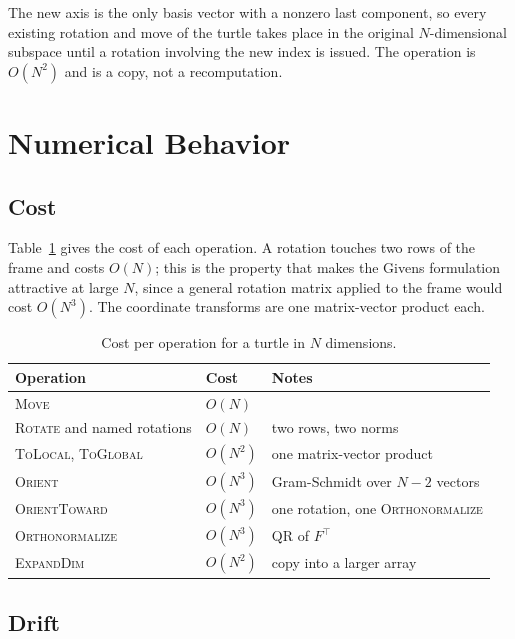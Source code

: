 \documentclass[11pt,letterpaper]{article}
\newcommand{\op}[1]{\textup{\textsc{#1}}}
\begin{document}
The new axis is the only basis vector with a nonzero last component,
so every existing rotation and move of the turtle takes place in the
original $N$-dimensional subspace until a rotation involving the new
index is issued. The operation is $O(N^2)$ and is a copy, not a
recomputation.

\section{Numerical Behavior}
\label{sec:numerics}

\subsection{Cost}

Table~\ref{tab:cost} gives the cost of each operation. A rotation
touches two rows of the frame and costs $O(N)$; this is the property
that makes the Givens formulation attractive at large $N$, since a
general rotation matrix applied to the frame would cost $O(N^3)$. The
coordinate transforms are one matrix-vector product each.

\begin{table}[h]
\centering
\caption{Cost per operation for a turtle in $N$ dimensions.}
\label{tab:cost}
\begin{tabular}{@{}lll@{}}
\toprule
\textbf{Operation} & \textbf{Cost} & \textbf{Notes} \\
\midrule
\op{Move} & $O(N)$ & \\
\op{Rotate} and named rotations & $O(N)$ & two rows, two norms \\
\op{ToLocal}, \op{ToGlobal} & $O(N^2)$ & one matrix-vector product \\
\op{Orient} & $O(N^3)$ & Gram-Schmidt over $N - 2$ vectors \\
\op{OrientToward} & $O(N^3)$ & one rotation, one \op{Orthonormalize} \\
\op{Orthonormalize} & $O(N^3)$ & QR of $F^\top$ \\
\op{ExpandDim} & $O(N^2)$ & copy into a larger array \\
\bottomrule
\end{tabular}
\end{table}

\subsection{Drift}
\end{document}

